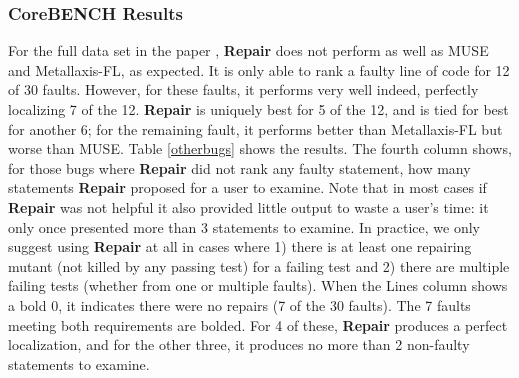 \subsubsection{CoreBENCH Results} For the full data set in the paper \cite{Papadakis}, {\bf Repair} does not perform as well as MUSE and Metallaxis-FL, as expected.   It is only able to  rank a faulty line of code for 12 of 30 faults.  However, for these faults, it performs very well indeed, perfectly localizing 7 of the 12.  {\bf Repair} is uniquely best for 5 of the 12, and is tied for best for another 6; for the remaining fault, it performs better than Metallaxis-FL but worse than MUSE.  Table \ref{otherbugs} shows the results.  The fourth column shows, for those bugs where {\bf Repair} did not rank any faulty statement, how many statements {\bf Repair} proposed for a user to examine.  Note that in most cases if {\bf Repair} was not helpful it also provided little output to waste a user's time: it only once presented more than 3 statements to examine.   In practice, we only suggest using {\bf Repair} at all in cases where 1) there is at least one repairing mutant (not killed by any passing test) for a failing test and 2) there are multiple failing tests (whether from one or multiple faults).  When the Lines column shows a bold 0, it indicates there were no repairs (7 of the 30 faults).  The 7 faults meeting both requirements are bolded.  For 4 of these, {\bf Repair} produces a perfect localization, and for the other three, it produces no more than 2 non-faulty statements to examine.

